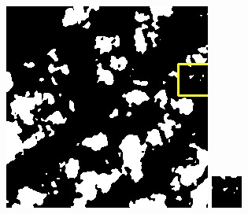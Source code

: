 \documentclass[UTF8]{ctexart}
\begin{document}
\begin{figure}[H]
{\begin{minipage}[b]{0.15\linewidth}
            \includegraphics[width=1\linewidth]{../log/cut/LC80980712014024LGN00_14882_unet.jpg}\vspace{4pt}
            \includegraphics[width=1\linewidth]{../log/cut/tmp_cut_LC80980712014024LGN00_14882_unet.jpg}

\end{minipage}}
\end{figure}
\end{document}
